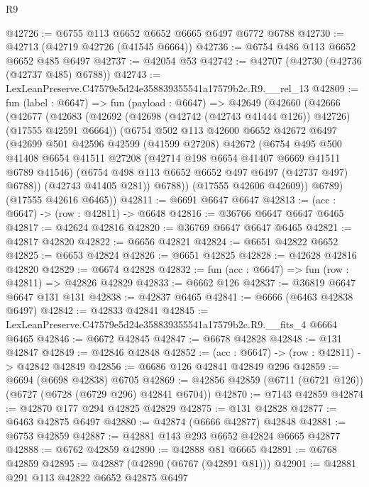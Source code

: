 \begin{lexlean}{R9}
\begin{coremodule}
@42726 := @6755 @113 @6652 @6652 @6665 @6497 @6772 @6788
@42730 := @42713 (@42719 @42726 (@41545 @6664))
@42736 := @6754 @486 @113 @6652 @6652 @485 @6497
@42737 := @42054 @53
@42742 := @42707 (@42730 (@42736 (@42737 @485) @6788))
@42743 := LexLeanPreserve.C47579e5d24e358839355541a17579b2c.R9.__rel_13
@42809 := fun (label : @6647) =>
  fun (payload : @6647) =>
  @42649
    (@42660
      (@42666
        (@42677
          (@42683
            (@42692 (@42698 (@42742 (@42743 @41444 @126)) @42726) (@17555 @42591 @6664))
            (@6754
              @502
              @113
              @42600
              @6652
              @42672
              @6497
              (@42699
                @501
                @42596
                @42599
                (@41599 @27208)
                @42672
                (@6754
                  @495
                  @500
                  @41408
                  @6654
                  @41511
                  @27208
                  (@42714 @198 @6654 @41407 @6669 @41511 @6789 @41546)
                  (@6754 @498 @113 @6652 @6652 @497 @6497 (@42737 @497) @6788))
                (@42743 @41405 @281))
              @6788))
          (@17555 @42606 @42609))
        @6789)
      (@17555 @42616 @6465))
@42811 := @6691 @6647 @6647
@42813 := (acc : @6647) -> (row : @42811) -> @6648
@42816 := @36766 @6647 @6647 @6465
@42817 := @42624 @42816
@42820 := @36769 @6647 @6647 @6465
@42821 := @42817 @42820
@42822 := @6656 @42821
@42824 := @6651 @42822 @6652
@42825 := @6653 @42824
@42826 := @6651 @42825
@42828 := @42628 @42816 @42820
@42829 := @6674 @42828
@42832 := fun (acc : @6647) => fun (row : @42811) => @42826 @42829
@42833 := @6662 @126
@42837 := @36819 @6647 @6647 @131 @131
@42838 := @42837 @6465
@42841 := @6666 (@6463 @42838 @6497)
@42842 := @42833 @42841
@42845 := LexLeanPreserve.C47579e5d24e358839355541a17579b2c.R9.__fits_4 @6664 @6465
@42846 := @6672 @42845
@42847 := @6678 @42828
@42848 := @131 @42847
@42849 := @42846 @42848
@42852 := (acc : @6647) -> (row : @42811) -> @42842 @42849
@42856 := @6686 @126 @42841 @42849 @296
@42859 := @6694 (@6698 @42838) @6705
@42869 := @42856 @42859 (@6711 (@6721 @126)) (@6727 (@6728 (@6729 @296) @42841 @6704))
@42870 := @7143 @42859
@42874 := @42870 @177 @294 @42825 @42829
@42875 := @131 @42828
@42877 := @6463 @42875 @6497
@42880 := @42874 (@6666 @42877) @42848
@42881 := @6753 @42859
@42887 := @42881 @143 @293 @6652 @42824 @6665 @42877
@42888 := @6762 @42859
@42890 := @42888 @81 @6665
@42891 := @6768 @42859
@42895 := @42887 (@42890 (@6767 (@42891 @81)))
@42901 := @42881 @291 @113 @42822 @6652 @42875 @6497

\end{coremodule}
\end{lexlean}
